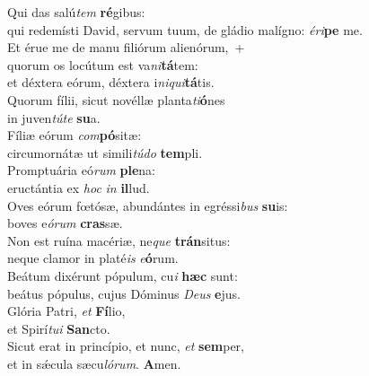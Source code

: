\evenverse Qui das salú\textit{tem} \textbf{ré}gibus:~\*\\
\evenverse qui redemísti David, servum tuum, de gládio malígno: \textit{é}\textit{ri}\textbf{pe} me.\\
\oddverse Et érue me de manu filiórum alienórum,~+\\
\oddverse  quorum os locútum est va\textit{ni}\textbf{tá}tem:~\*\\
\oddverse et déxtera eórum, déxtera i\textit{ni}\textit{qui}\textbf{tá}tis.\\
\evenverse Quorum fílii, sicut novéllæ planta\textit{ti}\textbf{ó}nes~\*\\
\evenverse in juven\textit{tú}\textit{te} \textbf{su}a.\\
\oddverse Fíliæ eórum \textit{com}\textbf{pó}sitæ:~\*\\
\oddverse circumornátæ ut simili\textit{tú}\textit{do} \textbf{tem}pli.\\
\evenverse Promptuária eó\textit{rum} \textbf{ple}na:~\*\\
\evenverse eructántia ex \textit{hoc} \textit{in} \textbf{il}lud.\\
\oddverse Oves eórum fœtósæ, abundántes in egréssi\textit{bus} \textbf{su}is:~\*\\
\oddverse boves e\textit{ó}\textit{rum} \textbf{cras}sæ.\\
\evenverse Non est ruína macériæ, ne\textit{que} \textbf{trán}situs:~\*\\
\evenverse neque clamor in platé\textit{is} \textit{e}\textbf{ó}rum.\\
\oddverse Beátum dixérunt pópulum, cu\textit{i} \textbf{hæc} sunt:~\*\\
\oddverse beátus pópulus, cujus Dóminus \textit{De}\textit{us} \textbf{e}jus.\\
\evenverse Glória Patri, \textit{et} \textbf{Fí}lio,~\*\\
\evenverse et Spirí\textit{tu}\textit{i} \textbf{San}cto.\\
\oddverse Sicut erat in princípio, et nunc, \textit{et} \textbf{sem}per,~\*\\
\oddverse et in sǽcula sæcu\textit{ló}\textit{rum}. \textbf{A}men.\\
